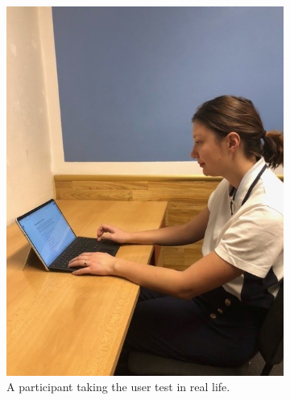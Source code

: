 \documentclass[11pt]{article}
\begin{document}
\begin{figure}[h!]
    \begin{subfigure}[b]{0.4\textwidth}
         \centering
         \includegraphics[width=\textwidth]{figures/Picture P1 Lena.jpg}
         \caption{A participant taking the user test in real life.}
         \label{fig:lenaUser}
    \end{subfigure}
    \hfill
    \begin{subfigure}[b]{0.53\textwidth}
         \centering

\end{subfigure}
\end{figure}
\end{document}
